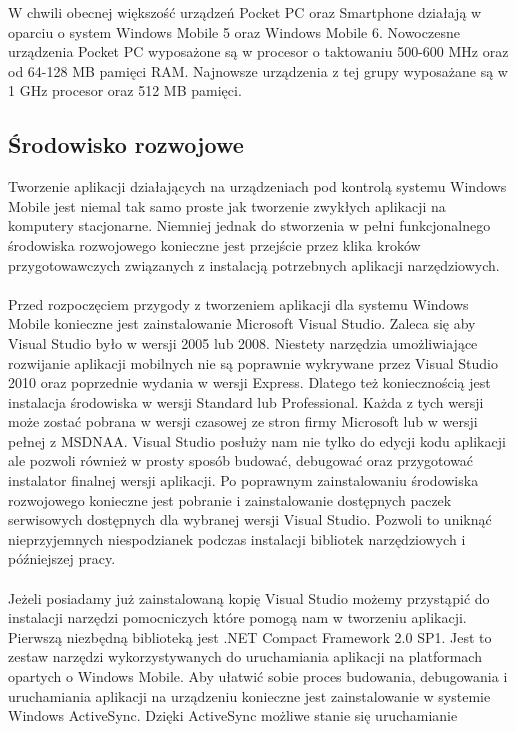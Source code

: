W chwili obecnej większość urządzeń Pocket PC oraz Smartphone działają w oparciu
o system Windows Mobile 5 oraz Windows Mobile 6. Nowoczesne urządzenia Pocket PC
wyposażone są w procesor o taktowaniu 500-600 MHz oraz od 64-128 MB pamięci RAM.
Najnowsze urządzenia z tej grupy wyposażane są w 1 GHz procesor oraz 512 MB
pamięci.
 

\subsection{Środowisko rozwojowe}
Tworzenie aplikacji działających na urządzeniach pod kontrolą systemu Windows
Mobile jest niemal tak samo proste jak tworzenie zwykłych aplikacji na komputery
stacjonarne. Niemniej jednak do stworzenia w pełni funkcjonalnego środowiska
rozwojowego konieczne jest przejście przez klika kroków przygotowawczych
związanych z instalacją potrzebnych aplikacji narzędziowych. \\
\\
Przed rozpoczęciem przygody z tworzeniem aplikacji dla systemu Windows Mobile
konieczne jest zainstalowanie Microsoft Visual Studio. Zaleca się aby Visual
Studio było w wersji 2005 lub 2008. Niestety narzędzia umożliwiające rozwijanie
aplikacji mobilnych nie są poprawnie wykrywane przez Visual Studio 2010 oraz
poprzednie wydania w wersji Express. Dlatego też koniecznością jest instalacja
środowiska w wersji Standard lub Professional. Każda z tych wersji może zostać
pobrana w wersji czasowej ze stron firmy Microsoft lub w wersji pełnej z MSDNAA.
Visual Studio posłuży nam nie tylko do edycji kodu aplikacji ale pozwoli również
w prosty sposób budować, debugować oraz przygotować instalator finalnej wersji
aplikacji. Po poprawnym zainstalowaniu środowiska rozwojowego konieczne jest
pobranie i zainstalowanie dostępnych paczek serwisowych dostępnych dla wybranej
wersji Visual Studio. Pozwoli to uniknąć nieprzyjemnych niespodzianek podczas
instalacji bibliotek narzędziowych i późniejszej pracy.\\
\\
Jeżeli posiadamy już zainstalowaną kopię Visual Studio możemy przystąpić do
instalacji narzędzi pomocniczych które pomogą nam w tworzeniu aplikacji.
Pierwszą niezbędną biblioteką jest .NET Compact Framework 2.0 SP1. Jest to
zestaw narzędzi wykorzystywanych do uruchamiania aplikacji na platformach
opartych o Windows Mobile. Aby ułatwić sobie proces budowania, debugowania i
uruchamiania aplikacji na urządzeniu konieczne jest zainstalowanie w systemie
Windows ActiveSync. Dzięki ActiveSync możliwe stanie się uruchamianie
